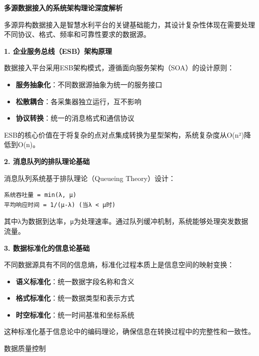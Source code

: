 \textbf{多源数据接入的系统架构理论深度解析}

多源异构数据接入是智慧水利平台的关键基础能力，其设计复杂性体现在需要处理不同协议、格式、频率和可靠性要求的数据源。

\textbf{1. 企业服务总线（ESB）架构原理}

数据接入平台采用ESB架构模式，遵循面向服务架构（SOA）的设计原则：

\begin{itemize}
\tightlist
\item
  \textbf{服务抽象化}：不同数据源抽象为统一的服务接口
\item
  \textbf{松散耦合}：各采集器独立运行，互不影响
\item
  \textbf{协议转换}：统一的消息格式和通信协议
\end{itemize}

ESB的核心价值在于将复杂的点对点集成转换为星型架构，系统复杂度从O(n²)降低到O(n)。

\textbf{2. 消息队列的排队理论基础}

消息队列系统基于排队理论（Queueing Theory）设计：

\begin{lstlisting}
系统吞吐量 = min(λ, μ)
平均响应时间 = 1/(μ-λ) (当λ < μ时)
\end{lstlisting}

其中λ为数据到达率，μ为处理速率。通过队列缓冲机制，系统能够处理突发数据流量。

\textbf{3. 数据标准化的信息论基础}

不同数据源具有不同的信息熵，标准化过程本质上是信息空间的映射变换：

\begin{itemize}
\tightlist
\item
  \textbf{语义标准化}：统一数据字段名称和含义
\item
  \textbf{格式标准化}：统一数据类型和表示方式\\
\item
  \textbf{时空标准化}：统一时间基准和坐标系统
\end{itemize}

这种标准化基于信息论中的编码理论，确保信息在转换过程中的完整性和一致性。

 数据质量控制

